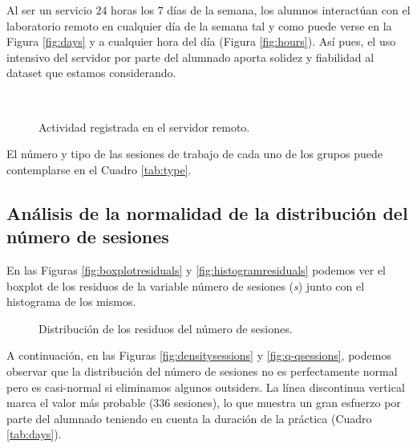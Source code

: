 Al ser un servicio $24$ horas los $7$ días de la semana, los alumnos interactúan con el laboratorio remoto en cualquier día de la semana tal y como puede verse en la Figura \ref{fig:days} y a cualquier hora del día (Figura \ref{fig:hours}). Así pues, el uso intensivo del servidor por parte del alumnado aporta solidez y fiabilidad al dataset que estamos considerando.

\begin{figure}[H]
\centering
{}\\
\caption{Actividad registrada en el servidor remoto.}
\label{fig:activity}
\end{figure}

El número y tipo de las sesiones de trabajo de cada uno de los grupos puede contemplarse en el Cuadro \ref{tab:type}.

\subsection{Análisis de la normalidad de la distribución del número de sesiones}\label{sec:NormalityNumSessions}

En las Figuras \ref{fig:boxplotresiduals} y \ref{fig:histogramresiduals} podemos ver el boxplot de los residuos de la variable número de sesiones (\emph{s}) junto con el histograma de los mismos.

\begin{figure}[H]
\centering
{}\qquad
{}
\caption{Distribución de los residuos del número de sesiones.}
\label{fig:activity}
\end{figure}

A continuación, en las Figuras \ref{fig:densitysessions} y \ref{fig:q-qsessions}, podemos observar que la distribución del número de sesiones no es perfectamente normal pero es casi-normal si eliminamos algunos outsiders. La línea discontinua vertical marca el valor más probable ($336$ sesiones), lo que muestra un gran esfuerzo por parte del alumnado teniendo en cuenta la duración de la práctica (Cuadro \ref{tab:days}).

